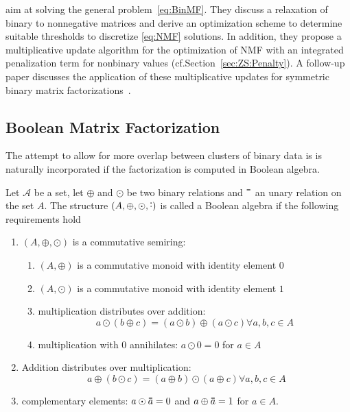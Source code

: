 \cite{zhang2007binary,zhang2010binary} aim at solving the general problem~\eqref{eq:BinMF}. They discuss a relaxation of binary to nonnegative matrices and derive an optimization scheme to determine suitable thresholds to discretize \ref{eq:NMF} solutions. In addition, they propose a multiplicative update algorithm for the optimization of NMF with an integrated penalization term for nonbinary values (cf.\@ Section~\ref{sec:ZS:Penalty}). A follow-up paper discusses the application of these multiplicative updates for symmetric binary matrix factorizations~\citep{zhang2013overlapping}. 
\subsection{Boolean Matrix Factorization}\label{sec:ZS:BooleanMF}
The attempt to allow for more overlap between clusters of binary data is  is naturally incorporated if the factorization is computed in Boolean algebra. 
\begin{definition}\label{def:BoolAlgebra}
Let $\mathcal{A}$ be a set, let $\oplus$ and $\odot$ be two binary relations and $\thickbar{\phantom{a}}$ an unary relation on the set $A$. The structure $(A,\oplus,\odot,\thickbar{\cdot})$ is called a Boolean algebra if the following requirements hold
\begin{enumerate}
    \item $(A,\oplus,\odot)$ is a commutative semiring:
    \begin{enumerate}
        \item $(A,\oplus)$ is a commutative monoid with identity element $0$
        \item $(A,\odot)$ is a commutative monoid with identity element $1$
        \item multiplication distributes over addition:
        \begin{equation*}
            a\odot(b\oplus c) = (a\odot b)\oplus (a\odot c) \forall a,b,c\in A
        \end{equation*}
        \item multiplication with $0$ annihilates: $a\odot 0=0$ for $a\in A$
    \end{enumerate}
    \item Addition distributes over multiplication:
    \begin{equation*}
        a\oplus(b\odot c) = (a\oplus b)\odot (a\oplus c) \forall a,b,c\in A
    \end{equation*}
    \item complementary elements: $a\odot \thickbar{a}=0$ and $a\oplus \thickbar{a}=1$ for $a\in A$.
\end{enumerate}
\end{definition}
